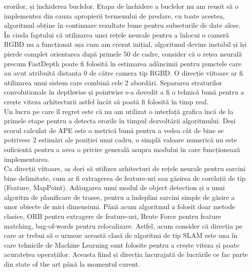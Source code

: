 \documentclass[12pt,a4paper]{report}
\begin{document}
erorilor, și închiderea buclelor. Etapa de închidere a buclelor nu am reușit să o 
implementez din cauza apropierii termenului de predare, cu toate acestea, algoritmul
obține în continuare rezultate bune pentru subseturile de date alese. \\
În ciuda faptului că utilizarea unei rețele neurale pentru a înlocui o cameră 
RGBD nu a funcționat așa cum am crezut inițial, algoritmul devine instabil și 
își pierde complet orientarea după primele 50 de cadre, consider că o rețea 
neurală precum FastDepth poate fi folosită în estimarea adâncimii pentru 
punctele care au avut atribuită distanța 0 de către camera tip RGBD.\@   
O direcție viitoare ar fi utilizarea unui sistem care combină cele 2 
abordări. Separarea straturilor convolutionale în depthwise și pointwise s-a dovedit
a fi o tehnică bună pentru a crește viteza arhitecturii astfel încât să poată fi
folosită în timp real. \\
Un lucru pe care îl regret este că nu am utilizat o interfață grafica încă de la 
primele etape pentru a detecta erorile în timpul dezvoltării algoritmului. Deși scorul
calculat de APE este o metrică bună pentru a vedea cât de bine se potrivesc 2 
estimări ale poziției unui cadru, o simplă valoare numerică nu este suficientă
pentru a avea o privire generală asupra modului în care funcționează implementarea. \\
Ca direcții viitoare, aș dori să utilizez arhitecturi de rețele neurale pentru
sarcini bine delimitate, cum ar fi extragerea de feature-uri sau găsirea de corelații
de tip (Feature, MapPoint). Adăugarea unui modul de object detection și a unui 
algoritm de planificare de trasee, pentru a îndeplini sarcini simple de găsire 
a unor obiecte de mici dimensiuni. Până acum algoritmul a folosit doar metode
clasice, ORB pentru extragere de feature-uri, Brute Force pentru 
feature matching, bag-of-words pentru relocalizare. Astfel, acum consider că direcția pe care ar
trebui să o urmeze această clasă de algoritmi de tip SLAM este una în care 
tehnicile de Machine Learning sunt folosite pentru a crește viteza și poate 
acuratețea operațiilor. Aceasta fiind și direcția încurajată de lucrările ce 
fac parte din state of the art până la momentul curent.
 
\printbibliography
\end{document}
